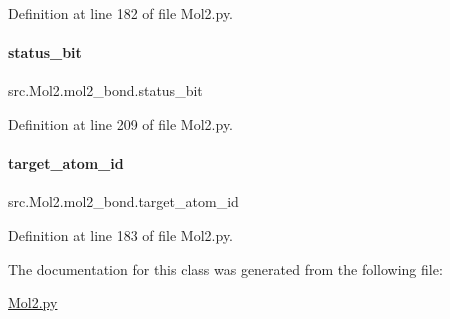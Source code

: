 Definition at line 182 of file Mol2.\+py.

\mbox{\label{classsrc_1_1Mol2_1_1mol2__bond_a6ecf583fc88ad0976bd05ead4c8d409c}} 
\paragraph{\texorpdfstring{status\+\_\+bit}{status\_bit}}
{\footnotesize\ttfamily src.\+Mol2.\+mol2\+\_\+bond.\+status\+\_\+bit}



Definition at line 209 of file Mol2.\+py.

\mbox{\label{classsrc_1_1Mol2_1_1mol2__bond_ae2417295a726650e16cc71984487d37d}} 
\paragraph{\texorpdfstring{target\+\_\+atom\+\_\+id}{target\_atom\_id}}
{\footnotesize\ttfamily src.\+Mol2.\+mol2\+\_\+bond.\+target\+\_\+atom\+\_\+id}



Definition at line 183 of file Mol2.\+py.



The documentation for this class was generated from the following file\+:\begin{DoxyCompactItemize}
\item 
\hyperlink{Mol2_8py}{Mol2.\+py}\end{DoxyCompactItemize}
